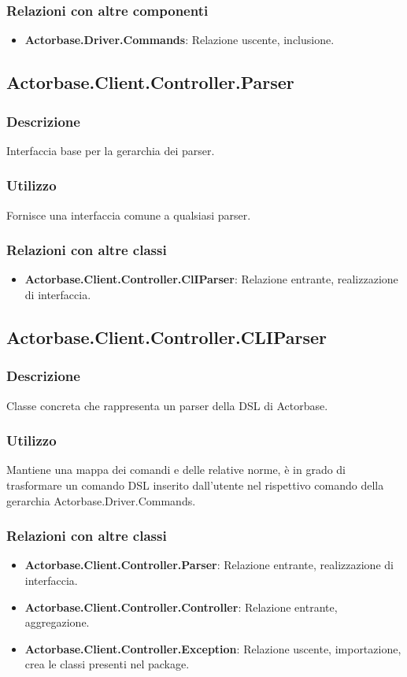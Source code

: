 \documentclass[a4paper]{article}
\begin{document}
			\subsubsection{Relazioni con altre componenti}
				\begin{itemize}
					\item \textbf{Actorbase.Driver.Commands}: Relazione uscente, inclusione.
				\end{itemize}								
					
		\subsection{Actorbase.Client.Controller.Parser}
			\subsubsection{Descrizione}
				Interfaccia base per la gerarchia dei parser.
			\subsubsection{Utilizzo}
				Fornisce una interfaccia comune a qualsiasi parser.
			\subsubsection{Relazioni con altre classi}
				\begin{itemize}
					\item \textbf{Actorbase.Client.Controller.ClIParser}: Relazione entrante, realizzazione di interfaccia.
				\end{itemize}
		
		\subsection{Actorbase.Client.Controller.CLIParser}
			\subsubsection{Descrizione}
				Classe concreta che rappresenta un parser della DSL di Actorbase.
			\subsubsection{Utilizzo}
				Mantiene una mappa dei comandi e delle relative norme, è in grado di trasformare un comando DSL inserito dall'utente nel rispettivo comando della gerarchia Actorbase.Driver.Commands.
			\subsubsection{Relazioni con altre classi}
				\begin{itemize}
					\item \textbf{Actorbase.Client.Controller.Parser}: Relazione entrante, realizzazione di interfaccia.
					\item \textbf{Actorbase.Client.Controller.Controller}: Relazione entrante, aggregazione.
					\item \textbf{Actorbase.Client.Controller.Exception}: Relazione uscente, importazione, crea le classi presenti nel package.
				\end{itemize}
				
\end{document}
